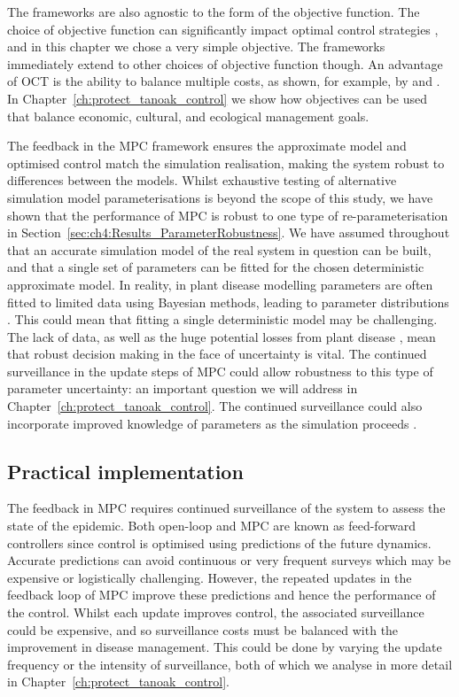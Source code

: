The frameworks are also agnostic to the form of the objective function. The choice of objective function can significantly impact optimal control strategies \citep{probert_decision_2016}, and in this chapter we chose a very simple objective. The frameworks immediately extend to other choices of objective function though. An advantage of OCT is the ability to balance multiple costs, as shown, for example, by \citet{brown_role_2011} and \citet{bokil_optimal_2019}. In Chapter~\ref{ch:protect_tanoak_control} we show how objectives can be used that balance economic, cultural, and ecological management goals.

The feedback in the MPC framework ensures the approximate model and optimised control match the simulation realisation, making the system robust to differences between the models. Whilst exhaustive testing of alternative simulation model parameterisations is beyond the scope of this study, we have shown that the performance of MPC is robust to one type of re-parameterisation in Section~\ref{sec:ch4:Results_ParameterRobustness}. We have assumed throughout that an accurate simulation model of the real system in question can be built, and that a single set of parameters can be fitted for the chosen deterministic approximate model. In reality, in plant disease modelling parameters are often fitted to limited data using Bayesian methods, leading to parameter distributions \citep[e.g.][]{kleczkowski_parameter_2007, parry_bayesian_2014}. This could mean that fitting a single deterministic model may be challenging. The lack of data, as well as the huge potential losses from plant disease \citep{savary_global_2019}, mean that robust decision making in the face of uncertainty is vital. The continued surveillance in the update steps of MPC could allow robustness to this type of parameter uncertainty: an important question we will address in Chapter~\ref{ch:protect_tanoak_control}. The continued surveillance could also incorporate improved knowledge of parameters as the simulation proceeds \citep{thompson_control_2018}.

\subsection{Practical implementation}

The feedback in MPC requires continued surveillance of the system to assess the state of the epidemic. Both open-loop and MPC are known as feed-forward controllers since control is optimised using predictions of the future dynamics. Accurate predictions can avoid continuous or very frequent surveys which may be expensive or logistically challenging. However, the repeated updates in the feedback loop of MPC improve these predictions and hence the performance of the control. Whilst each update improves control, the associated surveillance could be expensive, and so surveillance costs must be balanced with the improvement in disease management. This could be done by varying the update frequency or the intensity of surveillance, both of which we analyse in more detail in Chapter~\ref{ch:protect_tanoak_control}.

